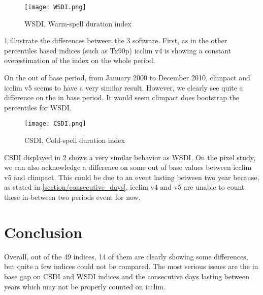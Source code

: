 \documentclass[a4paper,11pt]{article}
\begin{document}
    \begin{figure}[!hbt]
        \centering
        \texttt{[image: WSDI.png]}
        \caption{WSDI, Warm-spell duration index}
        \label{figure/wsdi}
    \end{figure}
    
    \ref{figure/wsdi} illustrate the differences between the 3 software.
    First, as in the other percentiles based indices (such as Tx90p) icclim v4 is showing a constant overestimation of the index on the whole period.

    On the out of base period, from January 2000 to December 2010, climpact and icclim v5 seems to have a very similar result.
    However, we clearly see quite a difference on the in base period. It would seem climpact does bootstrap the percentiles for WSDI.
   
    \begin{figure}[!hbt]
        \centering
        \texttt{[image: CSDI.png]}
        \caption{CSDI, Cold-spell duration index}
        \label{figure/csdi}
    \end{figure}

    CSDI displayed in \ref{figure/csdi} shows a very similar behavior as WSDI.
    On the pixel study, we can also acknowledge a difference on some out of base values between icclim v5 and climpact. This could be due to an event lasting between two year because, as stated in \ref{section/consecutive_days}, icclim v4 and v5 are unable to count these in-between two periods event for now.
 
    
\part{Conclusion}
    Overall, out of the 49 indices, 14 of them are clearly showing some differences, but quite a few indices could not be compared.
    The most serious issues are the in base gap on CSDI and WSDI indices and the consecutive days lasting between years which may not be properly counted on icclim.
\end{document}
